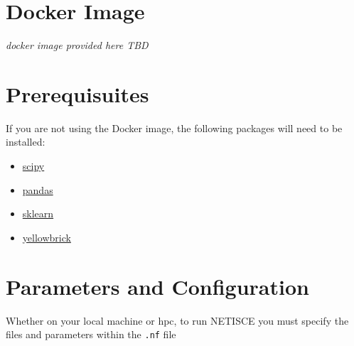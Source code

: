 \documentclass[
]{book}
\providecommand{\tightlist}{%
  \setlength{\itemsep}{0pt}\setlength{\parskip}{0pt}}
\theoremstyle{definition}
\theoremstyle{definition}
\theoremstyle{definition}
\theoremstyle{definition}
\theoremstyle{remark}
\begin{document}
\hypertarget{docker-image}{%
\section{Docker Image}\label{docker-image}}

\emph{docker image provided here TBD}

\hypertarget{prerequisuites}{%
\section{Prerequisuites}\label{prerequisuites}}

If you are not using the Docker image, the following packages will need to be installed:

\begin{itemize}
\tightlist
\item
  \href{https://scipy.org/install/}{scipy}
\item
  \href{https://pandas.pydata.org/getting_started.html}{pandas}
\item
  \href{https://scikit-learn.org/stable/install.html}{sklearn}
\item
  \href{https://www.scikit-yb.org/en/latest/quickstart.html}{yellowbrick}
\end{itemize}

\hypertarget{params}{%
\section{Parameters and Configuration}\label{params}}

Whether on your local machine or hpc, to run NETISCE you must specify the files and parameters within the \texttt{.nf} file
\end{document}
